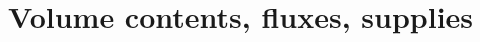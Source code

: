 \documentclass[a4paper,12pt,%
onecolumn,oneside,%
british%
]{memoir}
\renewcommand*{\|}[1][]{\nonscript\:#1\vert\nonscript\:\mathopen{}}
\begin{document}




















\printpagenotes*
\clearpage
\chapter{Volume contents, fluxes, supplies}
\label{cha:contents_fluxes}
\setcounter{section}{-1}
\end{document}
